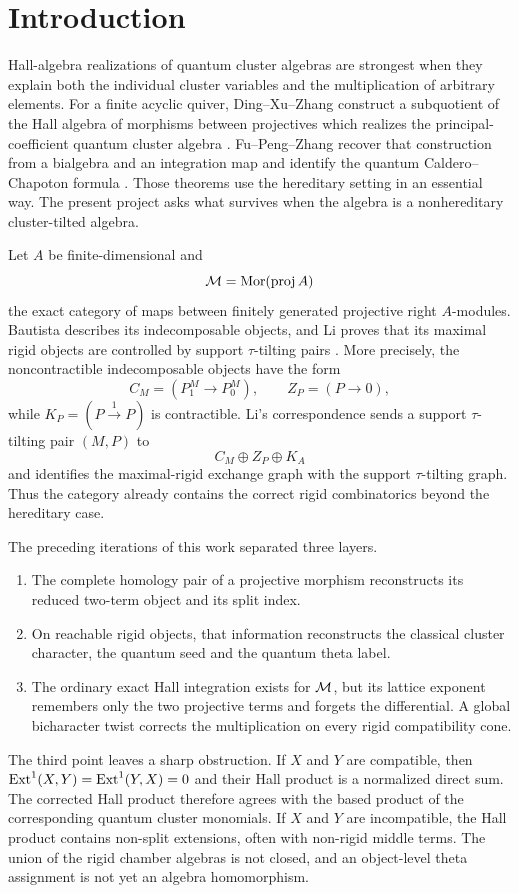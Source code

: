 \section{Introduction}
\label{sec:introduction}

Hall-algebra realizations of quantum cluster algebras are strongest when they
explain both the individual cluster variables and the multiplication of
arbitrary elements.  For a finite acyclic quiver, Ding--Xu--Zhang construct a
subquotient of the Hall algebra of morphisms between projectives which realizes
the principal-coefficient quantum cluster algebra
\cite{DingXuZhang}.  Fu--Peng--Zhang recover that construction from a bialgebra
and an integration map and identify the quantum Caldero--Chapoton formula
\cite{FuPengZhang}.  Those theorems use the hereditary setting in an essential
way.  The present project asks what survives when the algebra is a
nonhereditary cluster-tilted algebra.

Let $A$ be finite-dimensional and
\[
 \mathcal M=\operatorname{Mor}(\operatorname{proj} A)
\]
the exact category of maps between finitely generated projective right
$A$-modules.  Bautista describes its indecomposable objects, and Li proves that
its maximal rigid objects are controlled by support $\tau$-tilting pairs
\cite{Bautista,Li}.  More precisely, the noncontractible indecomposable objects
have the form
\[
 C_M=(P_1^M\longrightarrow P_0^M),
 \qquad
 Z_P=(P\longrightarrow0),
\]
while $K_P=(P\xrightarrow{1}P)$ is contractible.  Li's correspondence sends a
support $\tau$-tilting pair $(M,P)$ to
\[
 C_M\oplus Z_P\oplus K_A
\]
and identifies the maximal-rigid exchange graph with the support
$\tau$-tilting graph.  Thus the category already contains the correct rigid
combinatorics beyond the hereditary case.

The preceding iterations of this work separated three layers.
\begin{enumerate}[label=(\roman*),leftmargin=2.3em]
\item The complete homology pair of a projective morphism reconstructs its
      reduced two-term object and its split index.
\item On reachable rigid objects, that information reconstructs the classical
      cluster character, the quantum seed and the quantum theta label.
\item The ordinary exact Hall integration exists for $\mathcal M$, but its lattice
      exponent remembers only the two projective terms and forgets the
      differential.  A global bicharacter twist corrects the multiplication on
      every rigid compatibility cone.
\end{enumerate}
The third point leaves a sharp obstruction.  If $X$ and $Y$ are compatible,
then $\operatorname{Ext}^1(X,Y)=\operatorname{Ext}^1(Y,X)=0$ and their Hall product is a normalized direct
sum.  The corrected Hall product therefore agrees with the based product of
the corresponding quantum cluster monomials.  If $X$ and $Y$ are
incompatible, the Hall product contains non-split extensions, often with
non-rigid middle terms.  The union of the rigid chamber algebras is not closed,
and an object-level theta assignment is not yet an algebra homomorphism.

